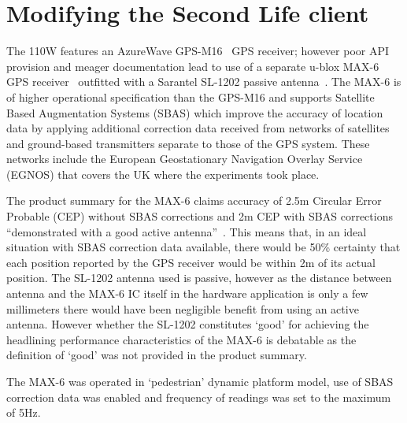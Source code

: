 \section{Modifying the Second Life client}


The 110W features an AzureWave GPS-M16~\cite{AzureWave} GPS receiver; however poor API provision and meager documentation lead to use of a separate u-blox MAX-6 GPS receiver~\cite{U-bloxAG} outfitted with a Sarantel SL-1202 passive antenna~\cite{Sarantel}. The MAX-6 is of higher operational specification than the GPS-M16 and supports Satellite Based Augmentation Systems (SBAS) which improve the accuracy of location data by applying additional correction data received from networks of satellites and ground-based transmitters separate to those of the GPS system. These networks include the European Geostationary Navigation Overlay Service (EGNOS) that covers the UK where the experiments took place.

The product summary for the MAX-6 claims accuracy of 2.5m Circular Error Probable (CEP) without SBAS corrections and 2m CEP with SBAS corrections ``demonstrated with a good active antenna''~\cite{U-bloxAG2012}. This means that, in an ideal situation with SBAS correction data available, there would be 50\% certainty that each position reported by the GPS receiver would be within 2m of its actual position. The SL-1202 antenna used is passive, however as the distance between antenna and the MAX-6 IC itself in the hardware application is only a few millimeters there would have been negligible benefit from using an active antenna. However whether the SL-1202 constitutes `good' for achieving the headlining performance characteristics of the MAX-6 is debatable as the definition of `good' was not provided in the product summary.

The MAX-6 was operated in `pedestrian' dynamic platform model, use of SBAS correction data was enabled and frequency of readings was set to the maximum of 5Hz.

